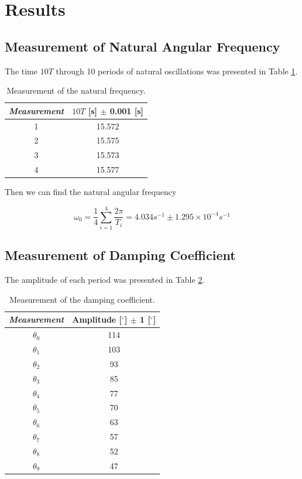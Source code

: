 \documentclass{article}
\begin{document}
\section{Results}

\subsection{Measurement of Natural Angular Frequency}

The time $10T$ through 10 periods of natural oscillations was presented in Table \ref{tab-1}.

\begin{table}[!h]
\begin{center}
\begin{tabular}{cc}
\hline
\textit{Measurement} & $10T$ [s] $\pm$ 0.001 [s] \\
\hline
1	&	15.572\\
2	&	15.575\\
3	&	15.573\\
4	&	15.577\\
\hline
\end{tabular}
\caption{Measurement of the natural frequency.}
\label{tab-1}
\end{center}
\end{table}

Then we can find the natural angular frequency

$$\omega_0=\frac{1}{4}\sum_{i=1}^4\frac{2\pi}{T_i}=4.034s^{-1}\pm1.295\times10^{-4}s^{-1}$$

\newpage

\subsection{Measurement of Damping Coefficient}

The amplitude of each period was presented in Table \ref{tab-2}.

\begin{table}[!h]
\begin{center}
\begin{tabular}{cc}
\hline
\textit{Measurement} & Amplitude [$^\circ$] $\pm$ 1 [$^\circ$] \\
\hline
$\theta_0$	&	114\\
$\theta_1$	&	103\\
$\theta_2$	&	93\\
$\theta_3$	&	85\\
$\theta_4$	&	77\\
$\theta_5$	&	70\\
$\theta_6$	&	63\\
$\theta_7$	&	57\\
$\theta_8$	&	52\\
$\theta_9$	&	47\\
\hline
\end{tabular}
\caption{Measurement of the damping coefficient.}
\label{tab-2}
\end{center}
\end{table}
\end{document}
